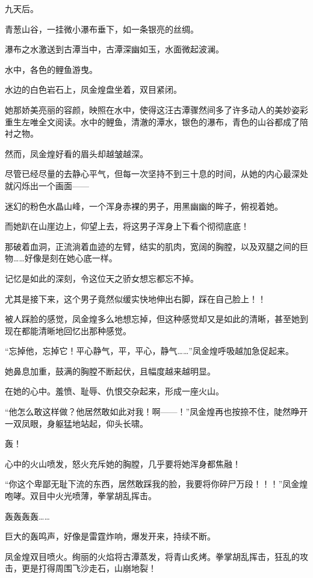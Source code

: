 
\begin{this_body}

九天后。

青葱山谷，一挂微小瀑布垂下，如一条银亮的丝绸。

瀑布之水激送到古潭当中，古潭深幽如玉，水面微起波澜。

水中，各色的鲤鱼游曳。

水边的白色岩石上，凤金煌盘坐着，双目紧闭。

她那娇美亮丽的容颜，映照在水中，使得这汪古潭骤然间多了许多动人的美妙姿彩重生左唯全文阅读。水中的鲤鱼，清澈的潭水，银色的瀑布，青色的山谷都成了陪衬之物。

然而，凤金煌好看的眉头却越皱越深。

尽管已经尽量的去静心平气，但每一次坚持不到三十息的时间，从她的内心最深处就闪烁出一个画面——

迷幻的粉色水晶山峰，一个浑身赤裸的男子，用黑幽幽的眸子，俯视着她。

而她趴在山崖边上，仰望上去，将这男子浑身上下看个彻彻底底！

那破着血洞，正流淌着血迹的左臂，结实的肌肉，宽阔的胸膛，以及双腿之间的巨物……好像是刻在她心底一样。

记忆是如此的深刻，令这位天之骄女想忘都忘不掉。

尤其是接下来，这个男子竟然似缓实快地伸出右脚，踩在自己脸上！！

被人踩脸的感觉，凤金煌多么地想忘掉，但这种感觉却又是如此的清晰，甚至她到现在都能清晰地回忆出那种感觉。

“忘掉他，忘掉它！平心静气，平，平心，静气……”凤金煌呼吸越加急促起来。

她鼻息加重，鼓满的胸膛不断起伏，且幅度越来越明显。

在她的心中。羞愤、耻辱、仇恨交杂起来，形成一座火山。

“他怎么敢这样做？他居然敢如此对我！啊——！”凤金煌再也按捺不住，陡然睁开一双凤眼，身躯猛地站起，仰头长啸。

轰！

心中的火山喷发，怒火充斥她的胸膛，几乎要将她浑身都焦融！

“你这个卑鄙无耻下流的东西，居然敢踩我的脸，我要将你碎尸万段！！！”凤金煌咆哮。双目中火光喷薄，拳掌胡乱挥击。

轰轰轰轰……

巨大的轰鸣声，好像是雷霆炸响，爆发开来，持续不断。

凤金煌双目喷火。绚丽的火焰将古潭蒸发，将青山炙烤。拳掌胡乱挥击，狂乱的攻击，更是打得周围飞沙走石，山崩地裂！


\end{this_body}
